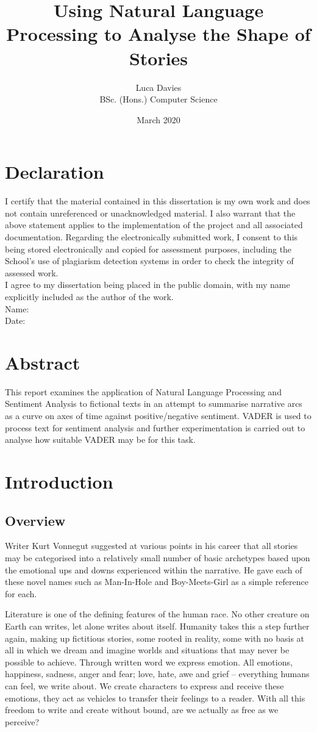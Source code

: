 \documentclass{article}
\title{\textbf{Using Natural Language Processing to Analyse the Shape of Stories}}
\author{
Luca Davies \\ BSc. (Hons.) Computer Science}
\date{March 2020}
\begin{document}
\maketitle
\newpage
\section*{Declaration}
    I certify that the material contained in this dissertation is my own work and does not contain unreferenced or unacknowledged material. I also warrant that the above statement applies to the implementation of the project and all associated documentation. Regarding the electronically submitted work, I consent to this being stored electronically and copied for assessment purposes, including the School’s use of plagiarism detection systems in order to check the integrity of assessed work. \\
    I agree to my dissertation being placed in the public domain, with my name explicitly included as the author of the work. \\
    
    \noindent
    Name: \\
    Date:
\newpage
\section*{Abstract}
    This report examines the application of Natural Language Processing and Sentiment Analysis to fictional texts in an attempt to summarise narrative arcs as a curve on axes of time against positive/negative sentiment. VADER is used to process text for sentiment analysis and further experimentation is carried out to analyse how suitable VADER may be for this task.
\newpage
\tableofcontents
\newpage
\section{Introduction}
    \subsection{Overview}
        Writer Kurt Vonnegut suggested at various points in his career that all stories may be categorised into a relatively small number of basic archetypes based upon the emotional ups and downs experienced within the narrative. He gave each of these novel names such as Man-In-Hole and Boy-Meets-Girl as a simple reference for each.

        Literature is one of the defining features of the human race. No other creature on Earth can writes, let alone writes about itself. Humanity takes this a step further again, making up fictitious stories, some rooted in reality, some with no basis at all in which we dream and imagine worlds and situations that may never be possible to achieve. Through written word we express emotion. All emotions, happiness, sadness, anger and fear; love, hate, awe and grief – everything humans can feel, we write about. We create characters to express and receive these emotions, they act as vehicles to transfer their feelings to a reader. With all this freedom to write and create without bound, are we actually as free as we perceive?
\end{document}
